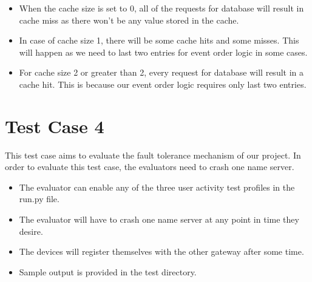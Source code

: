 \documentclass[12pt]{article}
\begin{document}
\begin{itemize}
	\item When the cache size is set to 0, all of the requests for database will result in cache miss
	as there won't be any value stored in the cache. 
	\item In case of cache size 1, there will be some cache hits and some misses. This will happen 
	as we need to last two entries for event order logic in some cases. 
	\item For cache size 2 or greater than 2, every request for database will result in a cache hit. 
	This is because our event order logic requires only last two entries.
\end{itemize}

\section{Test Case 4}

This test case aims to evaluate the fault tolerance mechanism of our project. In order to 
evaluate this test case, the evaluators need to crash one name server. 
\begin{itemize}
	\item The evaluator can enable any of the three user activity test profiles in the 
	run.py file. 
	\item The evaluator will have to crash one name server at any point in time they desire. 
	\item The devices will register themselves with the other gateway after some time. 
	\item Sample output is provided in the test directory.
\end{itemize}
\end{document}
